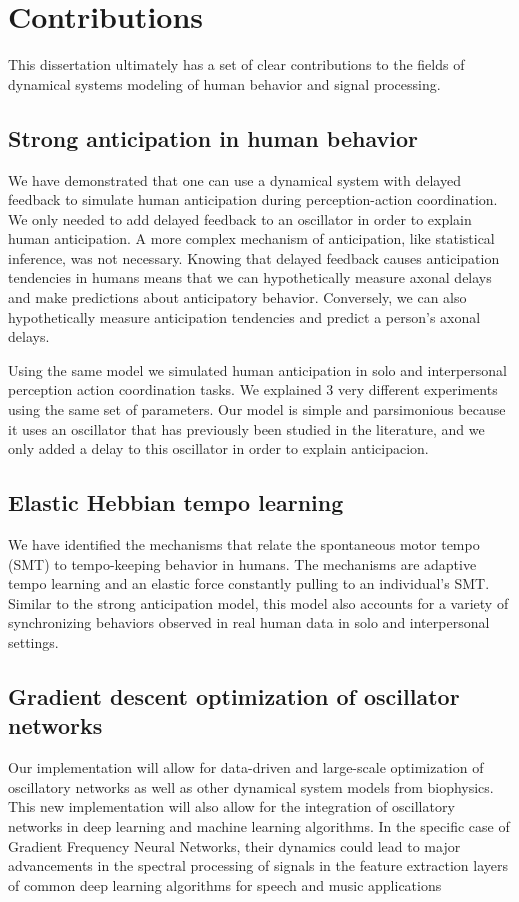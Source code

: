 \documentclass{report}
\begin{document}
\section{Contributions}
This dissertation ultimately has a set of clear contributions to the fields of dynamical systems modeling of human behavior and signal processing. 

\subsection{Strong anticipation in human behavior}
We have demonstrated that one can use a dynamical system with delayed feedback to simulate human anticipation during perception-action coordination. We only needed to add delayed feedback to an oscillator in order to explain human anticipation. A more complex mechanism of anticipation, like statistical inference, was not necessary. Knowing that delayed feedback causes anticipation tendencies in humans means that we can hypothetically measure axonal delays and make predictions about anticipatory behavior. Conversely, we can also hypothetically measure anticipation tendencies and predict a person’s axonal delays. 

Using the same model we simulated human anticipation in solo and interpersonal perception action coordination tasks. We explained 3 very different experiments using the same set of parameters. Our model is simple and parsimonious because it uses an oscillator that has previously been studied in the literature, and we only added a delay to this oscillator in order to explain anticipacion. 

\subsection{Elastic Hebbian tempo learning}
We have identified the mechanisms that relate the spontaneous motor tempo (SMT) to tempo-keeping behavior in humans. The mechanisms are adaptive tempo learning and an elastic force constantly pulling to an individual’s SMT. Similar to the strong anticipation model, this model also accounts for a variety of synchronizing behaviors observed in real human data in solo and interpersonal settings.

\subsection{Gradient descent optimization of oscillator networks}
Our implementation will allow for data-driven and large-scale optimization of oscillatory networks as well as other dynamical system models from biophysics. This new implementation will also allow for the integration of oscillatory networks in deep learning and machine learning algorithms. In the specific case of Gradient Frequency Neural Networks, their dynamics could lead to major advancements in the spectral processing of signals in the feature extraction layers of common deep learning algorithms for speech and music applications
\end{document}

